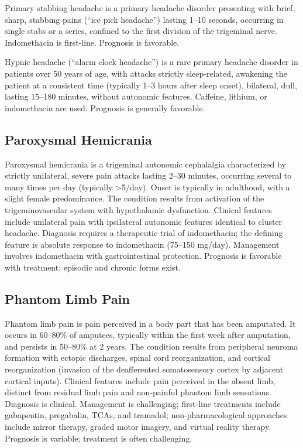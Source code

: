 Primary stabbing headache is a primary headache disorder presenting with brief, sharp, stabbing pains (``ice pick headache'') lasting 1--10 seconds, occurring in single stabs or a series, confined to the first division of the trigeminal nerve. Indomethacin is first-line. Prognosis is favorable.

Hypnic headache (``alarm clock headache'') is a rare primary headache disorder in patients over 50 years of age, with attacks strictly sleep-related, awakening the patient at a consistent time (typically 1--3 hours after sleep onset), bilateral, dull, lasting 15--180 minutes, without autonomic features. Caffeine, lithium, or indomethacin are used. Prognosis is generally favorable.

\subsection{Paroxysmal Hemicrania}
\label{sec:Paroxysmal Hemicrania}
Paroxysmal hemicrania is a trigeminal autonomic cephalalgia characterized by strictly unilateral, severe pain attacks lasting 2--30 minutes, occurring several to many times per day (typically >5/day). Onset is typically in adulthood, with a slight female predominance. The condition results from activation of the trigeminovascular system with hypothalamic dysfunction. Clinical features include unilateral pain with ipsilateral autonomic features identical to cluster headache. Diagnosis requires a therapeutic trial of indomethacin; the defining feature is absolute response to indomethacin (75--150 mg/day). Management involves indomethacin with gastrointestinal protection. Prognosis is favorable with treatment; episodic and chronic forms exist.

\subsection{Phantom Limb Pain}
\label{sec:Phantom Limb Pain}
Phantom limb pain is pain perceived in a body part that has been amputated. It occurs in 60--80\% of amputees, typically within the first week after amputation, and persists in 50--80\% at 2 years. The condition results from peripheral neuroma formation with ectopic discharges, spinal cord reorganization, and cortical reorganization (invasion of the deafferented somatosensory cortex by adjacent cortical inputs). Clinical features include pain perceived in the absent limb, distinct from residual limb pain and non-painful phantom limb sensations. Diagnosis is clinical. Management is challenging; first-line treatments include gabapentin, pregabalin, TCAs, and tramadol; non-pharmacological approaches include mirror therapy, graded motor imagery, and virtual reality therapy. Prognosis is variable; treatment is often challenging.

